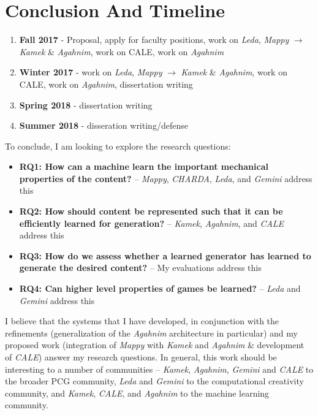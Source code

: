 \documentclass[12pt]{report}
\begin{document}
\chapter*{Conclusion And Timeline}

\begin{enumerate}
\item \textbf{Fall 2017} - Proposal, apply for faculty positions, work on \textit{Leda}, \textit{Mappy} $\rightarrow$ \textit{Kamek} \& \textit{Agahnim}, work on CALE, work on \textit{Agahnim}
\item \textbf{Winter 2017} - work on \textit{Leda}, \textit{Mappy} $\rightarrow$ \textit{Kamek} \& \textit{Agahnim}, work on CALE, work on \textit{Agahnim}, dissertation writing
\item \textbf{Spring 2018} - dissertation writing
\item \textbf{Summer 2018} - disseration writing/defense

\end{enumerate}

To conclude, I am looking to explore the research questions:

\begin{itemize}


\item \textbf{RQ1: How can a machine learn the important mechanical properties of the content?} -- \textit{Mappy}, \textit{CHARDA}, \textit{Leda}, and \textit{Gemini} address this


\item \textbf{RQ2: How should content be represented such that it can be efficiently learned for generation?} -- \textit{Kamek}, \textit{Agahnim}, and \textit{CALE} address this


\item \textbf{RQ3: How do we assess whether a learned generator has learned to generate the desired content?} -- My evaluations address this

\item \textbf{RQ4: Can higher level properties of games be learned?} -- \textit{Leda} and \textit{Gemini} address this

\end{itemize}

I believe that the systems that I have developed, in conjunction with the refinements (generalization of the \textit{Agahnim} architecture in particular) and my proposed work (integration of \textit{Mappy} with \textit{Kamek} and \textit{Agahnim} \& development of \textit{CALE}) answer my research questions.  In general, this work should be interesting to a number of communities --  \textit{Kamek}, \textit{Agahnim}, \textit{Gemini} and \textit{CALE} to the broader PCG community, \textit{Leda} and \textit{Gemini} to the computational creativity community, and \textit{Kamek}, \textit{CALE}, and \textit{Agahnim} to the machine learning community.




\end{document}
